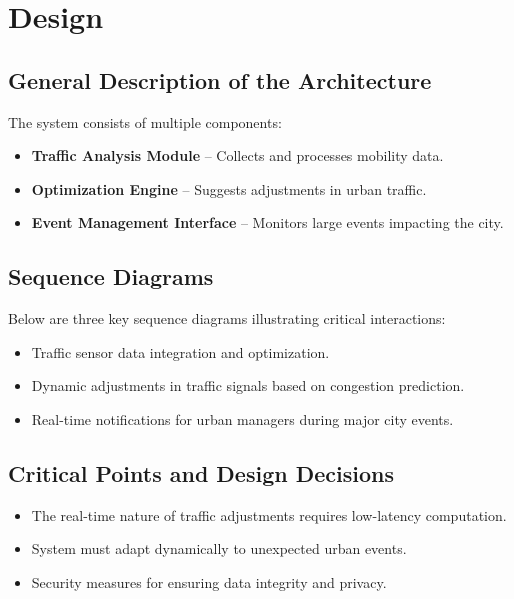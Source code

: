 \documentclass[a4paper,12pt]{article}
\begin{document}
\newpage

\section{Design}
\subsection{General Description of the Architecture}
The system consists of multiple components:
\begin{itemize}
    \item \textbf{Traffic Analysis Module} – Collects and processes mobility data.
    \item \textbf{Optimization Engine} – Suggests adjustments in urban traffic.
    \item \textbf{Event Management Interface} – Monitors large events impacting the city.
\end{itemize}

\subsection{Sequence Diagrams}
Below are three key sequence diagrams illustrating critical interactions:
\begin{itemize}
    \item Traffic sensor data integration and optimization.
    \item Dynamic adjustments in traffic signals based on congestion prediction.
    \item Real-time notifications for urban managers during major city events.
\end{itemize}

\subsection{Critical Points and Design Decisions}
\begin{itemize}
    \item The real-time nature of traffic adjustments requires low-latency computation.
    \item System must adapt dynamically to unexpected urban events.
    \item Security measures for ensuring data integrity and privacy.
\end{itemize}
\end{document}
